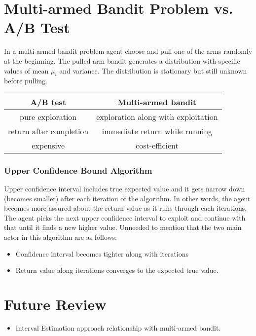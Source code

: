 \documentclass[a4paper,12pt]{article}
\begin{document}
\section{Multi-armed Bandit Problem vs. A/B Test}
In a multi-armed bandit problem agent choose and pull one of the arms randomly at the beginning. The pulled arm bandit generates a distribution with specific values of mean $\mu_i$ and variance. The distribution is stationary but still unknown before pulling. \autocite{Strehl and Littman 2008}

\begin{tabular}{|c|c|}
    \hline
    \textbf{A/B test}    &   \textbf{Multi-armed bandit}  \\
    \hline
    \hline
    pure exploration    &   exploration along with exploitation \\
    \hline
    return after completion &   immediate return while running \\
    \hline
    expensive   &   cost-efficient \\
    \hline
\end{tabular}

\subsubsection{Upper Confidence Bound Algorithm}
Upper confidence interval includes true expected value and it gets narrow down (becomes smaller) after each iteration of the algorithm. In other words, the agent becomes more assured about the return value as it runs through each iterations. The agent picks the next upper confidence interval to exploit and continue with that until it finds a new higher value. Unneeded to mention that the two main actor in this algorithm are as follows:
\begin{itemize}
    \item Confidence interval becomes tighter along with iterations
    \item Return value along iterations converges to the expected true value.
\end{itemize}

\section {Future Review}
\begin{itemize}
    \item Interval Estimation approach relationship with multi-armed bandit.

\end{itemize}





\end{document}
